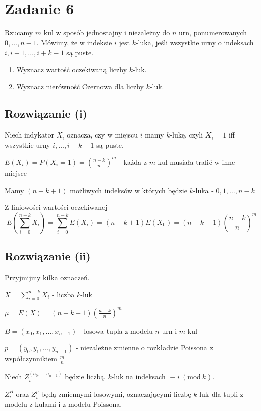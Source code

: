 \section{Zadanie 6}

Rzucamy \(m\) kul w sposób jednostajny i niezależny do \(n\) urn,
ponumerowanych \(0, \ldots, n-1\).
Mówimy, że w indeksie \(i\) jest \(k\)-luka,
jeśli wszystkie urny o indeksach \(i, i+1, \ldots, i+k-1\) są puste.

\begin{enumerate}[label=(\roman*)]
	\item Wyznacz wartość oczekiwaną liczby \(k\)-luk.
	\item Wyznacz nierówność Czernowa dla liczby \(k\)-luk.
\end{enumerate}

\subsection*{Rozwiązanie (i)}
Niech indykator \(X_i\) oznacza, czy w miejscu \(i\) mamy \(k\)-lukę,
czyli \(X_i = 1\) iff wszystkie urny \(i, \ldots, i+k-1\) są puste.

\( E(X_i) = P(X_i = 1) = \left(\frac{n-k}{n}\right)^{m} \)
- każda z \(m\) kul musiała trafić w inne miejsce

Mamy \((n-k+1)\) możliwych indeksów w których będzie \(k\)-luka -
\(0, 1, \ldots, n-k\)

Z liniowości wartości oczekiwanej
\[
	E\left(\sum_{i=0}^{n-k}X_i\right)
	= \sum_{i=0}^{n-k}E(X_i)
	= (n-k+1) E(X_0)
	= (n-k+1)\left(\frac{n-k}{n}\right)^{m}
\]

\subsection*{Rozwiązanie (ii)}
Przyjmijmy kilka oznaczeń.

\(X = \sum_{i=0}^{n-k}X_i\) - liczba \(k\)-luk

\(\mu = E(X) = (n-k+1)\left(\frac{n-k}{n}\right)^{m}\)

\(B = (x_0, x_1, \ldots, x_{n-1})\) - losowa tupla z
modelu \(n\) urn i \(m\) kul

\(p = (y_0, y_1, \ldots, y_{n-1})\) - niezależne zmienne o rozkładzie
Poissona z współczynnikiem \(\frac m n\)

Niech \(Z_i^{(a_0, \ldots, a_{n-1})}\) będzie liczbą \(k\)-luk na indeksach
\(\equiv i\ (\text{mod}\ k)\).

\(Z_i^B\) oraz \(Z_i^p\) będą zmiennymi losowymi, oznaczającymi liczbę
\(k\)-luk dla tupli z modelu z kulami i z modelu Poissona.

